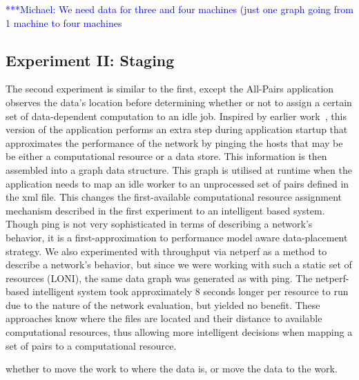 \documentclass{rspublic}
\newcommand{\micnote}[1]{ {\textcolor{blue} { ***Michael: #1 }}}
\newcommand{\betynote}[1]{ {\textcolor{orange} { ***Bety: #1 }}}
\newcommand{\jhanote}[1]{} \newcommand{\micnote}[1]{}\newcommand{\betynote}[1]{} \newcommand{\fixme}[1]{}
\begin{document}
\jhanote{We need data for compute (comparison) and I/O (only) for
different data-set sizes} \micnote{We need data for three and four
machines (just one graph going from 1 machine to four machines}

\subsection{Experiment II: Staging}
The second experiment is similar to the first, except the All-Pairs
application observes the data's location before determining whether or
not to assign a certain set of data-dependent computation to an idle
job. Inspired by earlier work~\citep{netperf}, this version of the
application performs an extra step during application startup that
approximates the performance of the network by pinging the hosts that
may be be either a computational resource or a data store. This
information is then assembled into a graph data structure. This graph
is utilised at runtime when the application needs to map an idle worker
to an unprocessed set of pairs defined in the xml file. This changes the
first-available computational resource assignment mechanism described in
the first experiment to an intelligent based system. Though ping is not
very sophisticated in terms of describing a network's behavior, it is a
first-approximation to performance model aware data-placement strategy.
We also experimented with throughput via netperf \jhanote{citation
needed} as a method to describe a network's behavior, but since we were
working with such a static set of resources (LONI), the same data graph
was generated as with ping. The netperf-based intelligent system took
approximately 8 seconds longer per resource to run due to the nature of
the network evaluation, but yielded no benefit. These approaches know
where the files are located and their distance to available
computational resources, thus allowing more intelligent decisions when
mapping a set of pairs to a computational resource.

whether to move the work
to where the data is, or move the data to the work. \jhanote{Data-aware
placement is also required, i.e., managing location of files.} 
\end{document}
